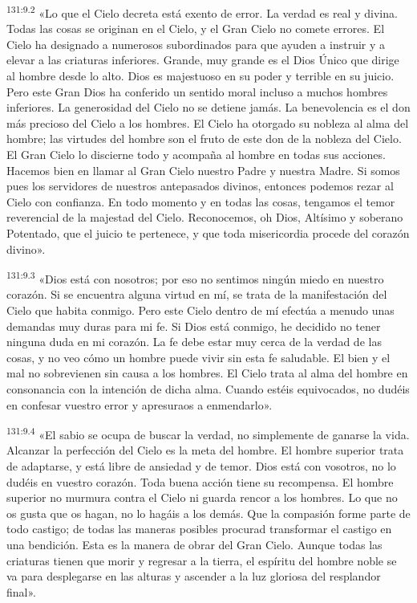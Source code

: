 \par
\textsuperscript{131:9.2} «Lo que el Cielo decreta está exento de error. La verdad es real y divina. Todas las cosas se originan en el Cielo, y el Gran Cielo no comete errores. El Cielo ha designado a numerosos subordinados para que ayuden a instruir y a elevar a las criaturas inferiores. Grande, muy grande es el Dios Único que dirige al hombre desde lo alto. Dios es majestuoso en su poder y terrible en su juicio. Pero este Gran Dios ha conferido un sentido moral incluso a muchos hombres inferiores. La generosidad del Cielo no se detiene jamás. La benevolencia es el don más precioso del Cielo a los hombres. El Cielo ha otorgado su nobleza al alma del hombre; las virtudes del hombre son el fruto de este don de la nobleza del Cielo. El Gran Cielo lo discierne todo y acompaña al hombre en todas sus acciones. Hacemos bien en llamar al Gran Cielo nuestro Padre y nuestra Madre. Si somos pues los servidores de nuestros antepasados divinos, entonces podemos rezar al Cielo con confianza. En todo momento y en todas las cosas, tengamos el temor reverencial de la majestad del Cielo. Reconocemos, oh Dios, Altísimo y soberano Potentado, que el juicio te pertenece, y que toda misericordia procede del corazón divino».

\par
\textsuperscript{131:9.3} «Dios está con nosotros; por eso no sentimos ningún miedo en nuestro corazón. Si se encuentra alguna virtud en mí, se trata de la manifestación del Cielo que habita conmigo. Pero este Cielo dentro de mí efectúa a menudo unas demandas muy duras para mi fe. Si Dios está conmigo, he decidido no tener ninguna duda en mi corazón. La fe debe estar muy cerca de la verdad de las cosas, y no veo cómo un hombre puede vivir sin esta fe saludable. El bien y el mal no sobrevienen sin causa a los hombres. El Cielo trata al alma del hombre en consonancia con la intención de dicha alma. Cuando estéis equivocados, no dudéis en confesar vuestro error y apresuraos a enmendarlo».

\par
\textsuperscript{131:9.4} «El sabio se ocupa de buscar la verdad, no simplemente de ganarse la vida. Alcanzar la perfección del Cielo es la meta del hombre. El hombre superior trata de adaptarse, y está libre de ansiedad y de temor. Dios está con vosotros, no lo dudéis en vuestro corazón. Toda buena acción tiene su recompensa. El hombre superior no murmura contra el Cielo ni guarda rencor a los hombres. Lo que no os gusta que os hagan, no lo hagáis a los demás. Que la compasión forme parte de todo castigo; de todas las maneras posibles procurad transformar el castigo en una bendición. Esta es la manera de obrar del Gran Cielo. Aunque todas las criaturas tienen que morir y regresar a la tierra, el espíritu del hombre noble se va para desplegarse en las alturas y ascender a la luz gloriosa del resplandor final».

